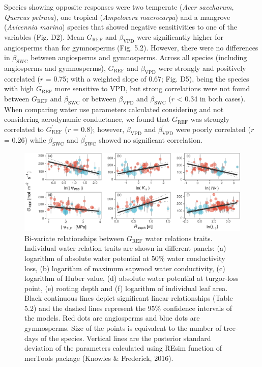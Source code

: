 \documentclass[11pt,twoside]{reedthesis}
\begin{document}
Species showing opposite responses were two temperate (\emph{Acer
saccharum}, \emph{Quercus petraea}), one tropical (\emph{Ampelocera
macrocarpa}) and a mangrove (\emph{Avicennia marina}) species that
showed negative sensitivities to one of the variables (Fig. D2). Mean
\(G_{\text{REF}}\) and \(\beta_{\text{VPD}}\) were significantly higher
for angiosperms than for gymnosperms (Fig. 5.2). However, there were no
differences in \(\beta_{\text{SWC}}\) between angiosperms and
gymnosperms. Across all species (including angiosperms and gymnosperms),
\(G_{\text{REF}}\) and \(\beta_{\text{VPD}}\) were strongly and
positively correlated (\(r\) = 0.75; with a weighted slope of 0.67; Fig.
D5), being the species with high \(G_{\text{REF}}\) more sensitive to
VPD, but strong correlations were not found between \(G_{\text{REF}}\)
and \(\beta_{\text{SWC}}\) or between \(\beta_{\text{VPD}}\) and
\(\beta_{\text{SWC}}\) (\textbar{}\(r\)\textbar{} \textless{} 0.34 in
both cases). When comparing water use parameters calculated considering
and not considering aerodynamic conductance, we found that
\(G_{\text{REF}}\) was strongly correlated to \(G_{\text{REF}}^{'}\)
(\(r\) = 0.8); however, \(\beta_{\text{VPD}}\) and
\(\beta_{\text{VPD}}^{'}\) were poorly correlated (\(r\) = 0.26) while
\(\beta_{\text{SWC}}\) and \(\beta_{\text{SWC}}^{'}\) showed no
significant correlation.\par
\begin{figure}[H]

{\centering \includegraphics[width=1\linewidth]{figure/CH5/Figure_3} 

}

\caption[Bi-variate relationships between $G_{\text{REF}}$ water relations traits.]{Bi-variate relationships between $G_{\text{REF}}$ water relations traits. Individual water relation traits are shown in different panels: (a) logarithm of absolute water potential at 50\% water conductivity loss, (b) logarithm of maximum sapwood water conductivity, (c) logarithm of Huber value, (d) absolute water potential at turgor-loss point, (e) rooting depth and (f) logarithm of individual leaf area. Black continuous lines depict significant linear relationships (Table 5.2) and the dashed lines represent the 95\% confidence intervals of the models. Red dots are angiosperms and blue dots are gymnosperms. Size of the points is equivalent to the number of tree-days of the species. Vertical lines are the posterior standard deviation of the parameters calculated using REsim function of merTools package (Knowles \& Frederick, 2016).}\label{fig:ch5fig3}
\end{figure}
\end{document}
